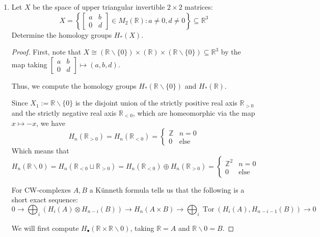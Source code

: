 \documentclass{article}
\DeclareMathOperator{\Tor}{Tor}
\begin{document}
\begin{enumerate}
	\item Let $X$ be the space of upper triangular invertible $2\times 2$ matrices:
	\[X = \left \{ \begin{bmatrix} a & b \\ 0 & d \end{bmatrix} \in M_2 (\mathbb{R}) : a \neq 0, d \neq 0\right \} \subseteq \mathbb{R}^3\]
	 Determine the homology groups $H_*(X)$. 

	
	\begin{proof}
		First, note that $X \cong (\mathbb{R} \backslash \{0\}) \times (\mathbb{R}) \times (\mathbb{R} \backslash \{0\})\subseteq \mathbb{R}^3$ by the map taking $\begin{bmatrix} a & b \\ 0 & d \end{bmatrix} \mapsto (a,b,d)$.
		
		Thus, we compute the homology groups $H_*(\mathbb{R} \backslash \{0\})$ and $H_*(\mathbb{R})$.
		
		Since $X_1 := \mathbb{R} \backslash \{0\}$ is the disjoint union of the strictly positive real axis $\mathbb{R}_{> 0}$ and the strictly negative real axis $\mathbb{R}_{< 0}$, which are homeomorphic via the map $x \mapsto -x$,
		we have 
		\[H_n(\mathbb{R}_{> 0}) = H_n(\mathbb{R}_{< 0}) = \begin{cases} \mathbb{Z} &n=0 \\ 0 &\text{else}  \end{cases} \]
		Which means that
		\[H_n(\mathbb{R} \backslash 0) = H_n(\mathbb{R}_{< 0}\sqcup \mathbb{R}_{> 0} ) = H_n(\mathbb{R}_{< 0}) \oplus H_n(\mathbb{R}_{> 0} )  = \begin{cases} \mathbb{Z}^2 & n=0 \\ 0 & \text{else} \end{cases}\]
		
		
		For CW-complexes $A,B$ a K\"unneth formula tells us that the following is a short exact sequence:
		\begin{equation} 0 \rightarrow \bigoplus_i \left ( H_i(A) \otimes H_{n-i}(B) \right ) \rightarrow H_n(A\times B) \rightarrow
		\bigoplus_i \Tor \left ( H_i(A), H_{n-i-1}(B) \right ) \rightarrow 0 \label{seq:Kunneth}\end{equation}
		
		We will first compute $H_\bullet (\mathbb{R} \times \mathbb{R}\backslash 0)$, taking $\mathbb{R} = A$ and $\mathbb{R}\backslash 0 = B$.
		

\end{proof}
\end{enumerate}
\end{document}
